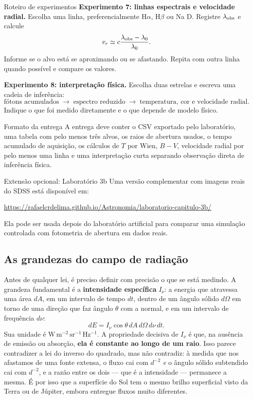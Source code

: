 \documentclass[11pt,a4paper]{article}
\begin{document}
\begin{lessonblock}[borderline west={2pt}{0pt}{astroGold}]{Roteiro de experimentos}
\textbf{Experimento 7: linhas espectrais e velocidade radial.}
Escolha uma linha, preferencialmente H$\alpha$, H$\beta$ ou Na D. Registre $\lambda_{\rm obs}$ e calcule
\[
v_r\simeq c\frac{\lambda_{\rm obs}-\lambda_0}{\lambda_0}.
\]
Informe se o alvo está se aproximando ou se afastando. Repita com outra linha quando possível e compare os valores.

\textbf{Experimento 8: interpretação física.}
Escolha duas estrelas e escreva uma cadeia de inferência:
\[
\text{fótons acumulados} \;\longrightarrow\; \text{espectro reduzido} \;\longrightarrow\; \text{temperatura, cor e velocidade radial}.
\]
Indique o que foi medido diretamente e o que depende de modelo físico.
\end{lessonblock}

\begin{lessonblock}{Formato da entrega}
A entrega deve conter o CSV exportado pelo laboratório, uma tabela com pelo menos três alvos, os raios de abertura usados, o tempo acumulado de aquisição, os cálculos de $T$ por Wien, $B-V$, velocidade radial por pelo menos uma linha e uma interpretação curta separando observação direta de inferência física.
\end{lessonblock}

\begin{lessonblock}{Extensão opcional: Laboratório 3b}
Uma versão complementar com imagens reais do SDSS está disponível em:
\begin{center}
\url{https://rafaelcrdelima.github.io/Astronomia/laboratorio-capitulo-3b/}
\end{center}
Ela pode ser usada depois do laboratório artificial para comparar uma simulação controlada com fotometria de abertura em dados reais.
\end{lessonblock}
\subsection*{As grandezas do campo de radiação}

Antes de qualquer lei, é preciso definir com precisão o que se está medindo. A grandeza fundamental é a \textbf{intensidade específica} $I_\nu$: a energia que atravessa uma área $dA$, em um intervalo de tempo $dt$, dentro de um ângulo sólido $d\Omega$ em torno de uma direção que faz ângulo $\theta$ com a normal, e em um intervalo de frequência $d\nu$:
\[
dE=I_\nu\cos\theta\,dA\,d\Omega\,d\nu\,dt.
\]
Sua unidade é $\mathrm{W\,m^{-2}\,sr^{-1}\,Hz^{-1}}$. A propriedade decisiva de $I_\nu$ é que, na ausência de emissão ou absorção, \textbf{ela é constante ao longo de um raio}. Isso parece contradizer a lei do inverso do quadrado, mas não contradiz: à medida que nos afastamos de uma fonte extensa, o fluxo cai com $d^{-2}$ \emph{e} o ângulo sólido subtendido cai com $d^{-2}$, e a razão entre os dois --- que é a intensidade --- permanece a mesma. É por isso que a superfície do Sol tem o mesmo brilho superficial visto da Terra ou de Júpiter, embora entregue fluxos muito diferentes.
\end{document}
